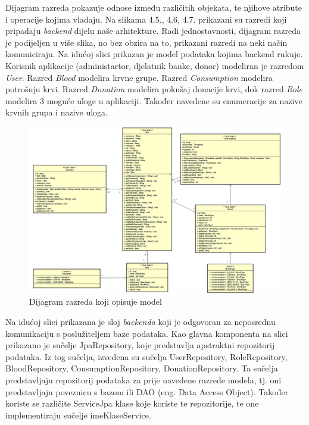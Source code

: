 	Dijagram razreda pokazuje odnose između različitih objekata, te njihove atribute i operacije kojima vladaju. Na slikama 4.5., 4.6, 4.7. prikazani su razredi koji pripadaju \textit{backend} dijelu naše arhitekture. Radi jednostavnosti, dijagram razreda je podijeljen u više slika, no bez obzira na to, prikazani razredi na neki način komuniciraju.
	Na idućoj slici prikazan je model podataka kojima backend rukuje. Korisnik aplikacije (administartor, djelatnik banke, donor) modeliran je razredom \textit{User}. Razred \textit{Blood} modelira krvne grupe. Razred \textit{Consumption} modelira potrošnju krvi. Razred \textit{Donation} modelira pokušaj donacije krvi, dok razred \textit{Role} modelira 3 moguće uloge u aplikaciji. Također navedene su enumeracije za nazive krvnih grupa i nazive uloga.
\begin{figure}[H]
	\centering
	\includegraphics[width=\textwidth, scale=2.0]{dijagrami/dijagram_razreda1}
	\caption{Dijagram razreda koji opisuje model}
	\label{fig:dijagram_modela}
\end{figure}
		
	\eject
	Na idućoj slici prikazana je sloj \textit{backenda} koji je odgovoran za neposrednu komunikaciju s poslužiteljem baze podataka. Kao glavna komponenta na slici prikazano je sučelje JpaRepository, koje predstavlja apstraktni repozitorij podataka. Iz tog sučelja, izvedena su sučelja UserRepository, RoleRepository, BloodRepository, ConsumptionRepository, DonationRepository. Ta sučelja predstavljaju repozitorij podataka za prije navedene razrede modela, tj. oni predstavljaju poveznicu s bazom ili DAO (eng. Data Access Object). Također koriste se različite ServiceJpa klase koje koriste te repozitorije, te one implementiraju sučelje imeKlaseService. 
	
